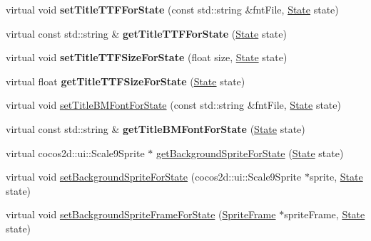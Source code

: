 \begin{DoxyCompactItemize}
\item 
\mbox{\label{classControlButton_a0307b352015d446633f21aa000119b96}} 
virtual void {\bfseries set\+Title\+T\+T\+F\+For\+State} (const std\+::string \&fnt\+File, \hyperlink{classControl_a89e9598cd785841ac91cff3c4798c469}{State} state)
\item 
\mbox{\label{classControlButton_a144ca8476e5ed4adb9193c35cdf5225f}} 
virtual const std\+::string \& {\bfseries get\+Title\+T\+T\+F\+For\+State} (\hyperlink{classControl_a89e9598cd785841ac91cff3c4798c469}{State} state)
\item 
\mbox{\label{classControlButton_af0cdae77fa50d36fb31d8ad6b8463c55}} 
virtual void {\bfseries set\+Title\+T\+T\+F\+Size\+For\+State} (float size, \hyperlink{classControl_a89e9598cd785841ac91cff3c4798c469}{State} state)
\item 
\mbox{\label{classControlButton_a6255e0850601392ac9037e9bf044808a}} 
virtual float {\bfseries get\+Title\+T\+T\+F\+Size\+For\+State} (\hyperlink{classControl_a89e9598cd785841ac91cff3c4798c469}{State} state)
\item 
virtual void \hyperlink{classControlButton_afe4abc45ed9984bdc0e86fd2fea3bd73}{set\+Title\+B\+M\+Font\+For\+State} (const std\+::string \&fnt\+File, \hyperlink{classControl_a89e9598cd785841ac91cff3c4798c469}{State} state)
\item 
\mbox{\label{classControlButton_a75591851a3a63fa245884802ed172a56}} 
virtual const std\+::string \& {\bfseries get\+Title\+B\+M\+Font\+For\+State} (\hyperlink{classControl_a89e9598cd785841ac91cff3c4798c469}{State} state)
\item 
virtual cocos2d\+::ui\+::\+Scale9\+Sprite $\ast$ \hyperlink{classControlButton_a07ae47cf7ce5f8b91cedf311ebf9690f}{get\+Background\+Sprite\+For\+State} (\hyperlink{classControl_a89e9598cd785841ac91cff3c4798c469}{State} state)
\item 
virtual void \hyperlink{classControlButton_a9be0490a60e89847a0c6d69cc65d36f8}{set\+Background\+Sprite\+For\+State} (cocos2d\+::ui\+::\+Scale9\+Sprite $\ast$sprite, \hyperlink{classControl_a89e9598cd785841ac91cff3c4798c469}{State} state)
\item 
virtual void \hyperlink{classControlButton_a16eeede3ea83110e18b9701ae4e519eb}{set\+Background\+Sprite\+Frame\+For\+State} (\hyperlink{classSpriteFrame}{Sprite\+Frame} $\ast$sprite\+Frame, \hyperlink{classControl_a89e9598cd785841ac91cff3c4798c469}{State} state)

\end{DoxyCompactItemize}
